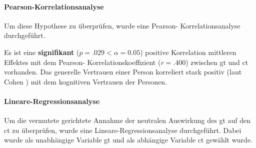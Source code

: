 \documentclass[a4paper,11pt]{article}%
\renewcommand{\\}{\vspace*{0.5\baselineskip} \newline}
\begin{document}
\paragraph{Pearson-Korrelationsanalyse}
Um diese Hypothese zu überprüfen, wurde eine Pearson- Korrelationsanalyse durchgeführt. 

	
Es ist eine \textbf{signifikant} ($p = .029 < \alpha = 0.05$) positive Korrelation mittleren Effektes mit dem Pearson- Korrelationskoeffizient ($r = .400$) zwischen \ac{gt} und \ac{ct} vorhanden. 
Das generelle Vertrauen einer Person korreliert stark positiv (laut Cohen \cite{cohen2013statistical}) mit dem kognitiven Vertrauen der Personen.

\paragraph{Lineare-Regressionsanalyse}
Um die vermutete gerichtete Annahme der neutralen Auswirkung des \ac{gt} auf den \ac{ct} zu überprüfen, wurde eine Lineare-Regressionsanalyse durchgeführt. Dabei wurde als unabhängige Variable \ac{gt} und als abhängige Variable \ac{ct} gewählt wurde.
%
\end{document}
